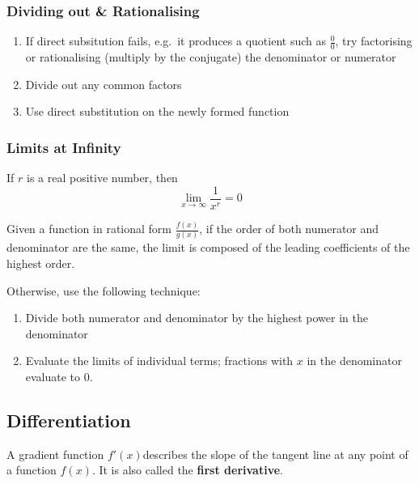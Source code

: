 \subsubsection{Dividing out \& Rationalising}
\begin{enumerate}
	\item If direct subsitution fails, e.g.\ it produces a quotient such as \(\frac{0}{0}\), try factorising or rationalising (multiply by the conjugate) the denominator or numerator
	\item Divide out any common factors
	\item Use direct substitution on the newly formed function
\end{enumerate}

\subsubsection{Limits at Infinity}

If \(r\) is a real positive number, then
\[
	\lim_{x\to\infty}\frac{1}{x^r} = 0
\]


Given a function in rational form \(\frac{f(x)}{g(x)}\), if the order of both numerator and denominator are the same, the limit is composed of the leading coefficients of the highest order.


Otherwise, use the following technique:
\begin{enumerate}
	\item Divide both numerator and denominator by the highest power in the denominator
	\item Evaluate the limits of individual terms; fractions with \(x\) in the denominator evaluate to 0.
\end{enumerate}

\subsection{Differentiation}

A gradient function \( f'(x) \)describes the slope of the tangent line at any point of a function \(f(x)\). It is also called the \textbf{first derivative}.

